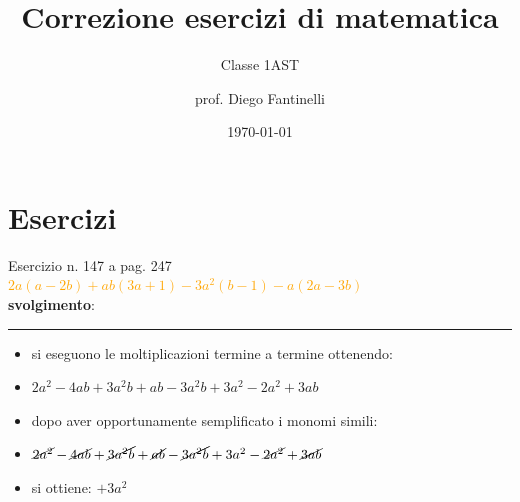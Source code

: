 \documentclass[10pt, aspectratio=169]{beamer}
\title{Correzione esercizi di matematica}
\subtitle{Classe 1AST}
\date{\today}
\author{prof. Diego Fantinelli}
\institute{ITET Pasini - Schio}
\begin{document}


\begin{frame}
	\titlepage
\end{frame}

\section{Esercizi}

\begin{frame}{Esercizio n. 147 a pag. 247}
\textcolor{orange}{\Large $2 a(a-2 b)+a b(3 a+1)-3 a^2(b-1)-a(2 a-3 b)$} \\[10pt]
\textbf{svolgimento}:\\[10pt]
\hrule
    \begin{itemize}
        \item si eseguono le moltiplicazioni termine a termine ottenendo:
        \item $2a^2 - 4ab + 3a^2 b+ ab -3a^2 b + 3a^2 - 2a^2 + 3ab$
        \item dopo aver opportunamente semplificato i monomi simili:
        \item $\cancel{2a^2} - \cancel{4ab} + \cancel{3a^2 b}+ \cancel{ab} - \cancel{3a^2 b} + 3a^2 - \cancel{2a^2} + \cancel{3ab}$
        \item si ottiene: \Large{$+3a^2$}
    \end{itemize}
\end{frame}
\end{document}
